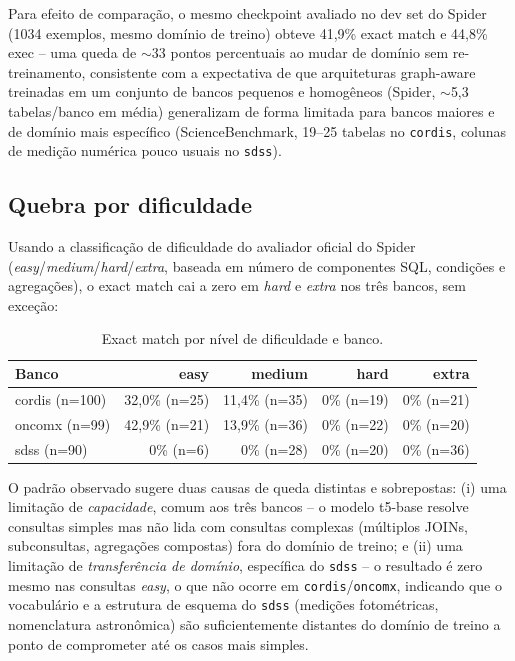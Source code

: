 Para efeito de comparação, o mesmo checkpoint avaliado no dev set do Spider
(1034 exemplos, mesmo domínio de treino) obteve 41,9\% exact match e 44,8\%
exec -- uma queda de $\sim$33 pontos percentuais ao mudar de domínio sem
re-treinamento, consistente com a expectativa de que arquiteturas
graph-aware treinadas em um conjunto de bancos pequenos e homogêneos (Spider,
$\sim$5,3 tabelas/banco em média) generalizam de forma limitada para bancos
maiores e de domínio mais específico (ScienceBenchmark, 19--25 tabelas no
\texttt{cordis}, colunas de medição numérica pouco usuais no \texttt{sdss}).

\subsection{Quebra por dificuldade}

Usando a classificação de dificuldade do avaliador oficial do Spider
(\emph{easy}/\emph{medium}/\emph{hard}/\emph{extra}, baseada em número de
componentes SQL, condições e agregações), o exact match cai a zero em
\emph{hard} e \emph{extra} nos três bancos, sem exceção:

\begin{table}[h]
\centering
\caption{Exact match por nível de dificuldade e banco.}
\label{tab:sciencebenchmark-hardness}
\begin{tabular}{lrrrr}
\toprule
\textbf{Banco} & \textbf{easy} & \textbf{medium} & \textbf{hard} & \textbf{extra} \\
\midrule
cordis (n=100) & 32,0\% (n=25) & 11,4\% (n=35) & 0\% (n=19) & 0\% (n=21) \\
oncomx (n=99)  & 42,9\% (n=21) & 13,9\% (n=36) & 0\% (n=22) & 0\% (n=20) \\
sdss (n=90)    & 0\% (n=6)     & 0\% (n=28)    & 0\% (n=20) & 0\% (n=36) \\
\bottomrule
\end{tabular}
\end{table}

O padrão observado sugere duas causas de queda distintas e sobrepostas: (i)
uma limitação de \emph{capacidade}, comum aos três bancos -- o modelo t5-base
resolve consultas simples mas não lida com consultas complexas (múltiplos
JOINs, subconsultas, agregações compostas) fora do domínio de treino; e (ii)
uma limitação de \emph{transferência de domínio}, específica do
\texttt{sdss} -- o resultado é zero mesmo nas consultas \emph{easy}, o que não
ocorre em \texttt{cordis}/\texttt{oncomx}, indicando que o vocabulário e a
estrutura de esquema do \texttt{sdss} (medições fotométricas, nomenclatura
astronômica) são suficientemente distantes do domínio de treino a ponto de
comprometer até os casos mais simples.


